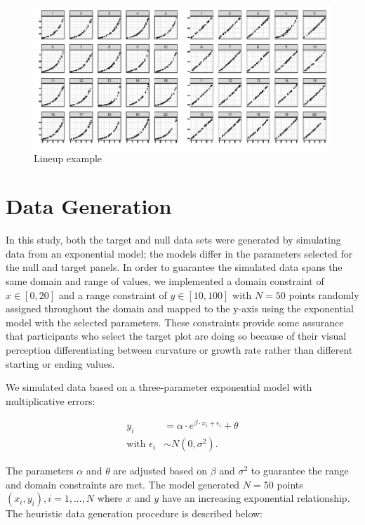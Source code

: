 \documentclass[print]{nuthesis}
\begin{document}
\begin{figure}

{\centering \includegraphics[width=\linewidth]{thesis_files/figure-latex/lineup-example-1} 

}

\caption{Lineup example}\label{fig:lineup-example}
\end{figure}

\hypertarget{data-generation}{%
\section{Data Generation}\label{data-generation}}

In this study, both the target and null data sets were generated by simulating data from an exponential model; the models differ in the parameters selected for the null and target panels.
In order to guarantee the simulated data spans the same domain and range of values, we implemented a domain constraint of \(x\in [0,20]\) and a range constraint of \(y\in [10,100]\) with \(N = 50\) points randomly assigned throughout the domain and mapped to the y-axis using the exponential model with the selected parameters.
These constraints provide some assurance that participants who select the target plot are doing so because of their visual perception differentiating between curvature or growth rate rather than different starting or ending values.

We simulated data based on a three-parameter exponential model with multiplicative errors:

\begin{align}
y_i & = \alpha\cdot e^{\beta\cdot x_i + \epsilon_i} + \theta \\
\text{with } \epsilon_i & \sim N(0, \sigma^2). \nonumber
\end{align}

\noindent The parameters \(\alpha\) and \(\theta\) are adjusted based on \(\beta\) and \(\sigma^2\) to guarantee the range and domain constraints are met.
The model generated \(N = 50\) points \((x_i, y_i), i = 1,...,N\) where \(x\) and \(y\) have an increasing exponential relationship.
The heuristic data generation procedure is described below:
\end{document}

